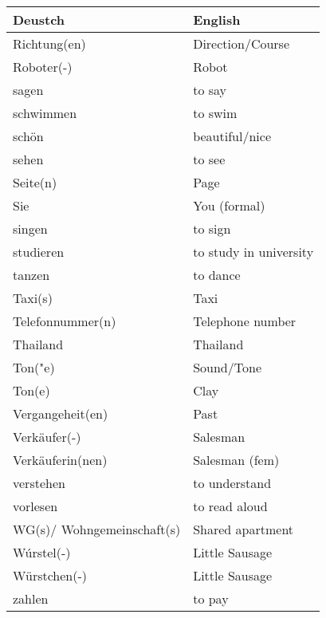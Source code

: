 \documentclass{article}
\renewcommand{\arraystretch}{1}
\begin{document}
\newpage

\begin{minipage}{0.48\textwidth}
    \centering
    \renewcommand{\arraystretch}{1.5}
    \begin{tabular}{|>{\raggedright\arraybackslash}p{3.5cm}|>{\raggedright\arraybackslash}p{3.5cm}|}
        \hline
        \rowcolor{gray!20} \textbf{Deustch} & \textbf{English} \\
        \hline
        Richtung(en) & Direction/Course \\\hline
        Roboter(-) & Robot \\\hline
        sagen & to say \\\hline
        schwimmen & to swim \\\hline
        schön & beautiful/nice \\\hline
        sehen & to see \\\hline
        Seite(n) & Page \\\hline
        Sie & You (formal) \\\hline
        singen & to sign \\\hline
        studieren & to study in university \\\hline
        tanzen & to dance \\\hline
        Taxi(s) & Taxi \\\hline
        Telefonnummer(n) & Telephone number \\\hline
        Thailand & Thailand \\\hline
        Ton("e) & Sound/Tone \\\hline
        Ton(e) & Clay \\\hline
        Vergangeheit(en) & Past \\\hline
        Verkäufer(-) & Salesman \\\hline
        Verkäuferin(nen) & Salesman (fem) \\\hline
        verstehen & to understand \\\hline
        vorlesen & to read aloud \\\hline
        WG(s)/ Wohngemeinschaft(s) & Shared apartment \\\hline
        Wúrstel(-) & Little Sausage \\\hline
        Würstchen(-) & Little Sausage \\\hline
        zahlen & to pay \\\hline
    \end{tabular}
\end{minipage}%
\end{document}
